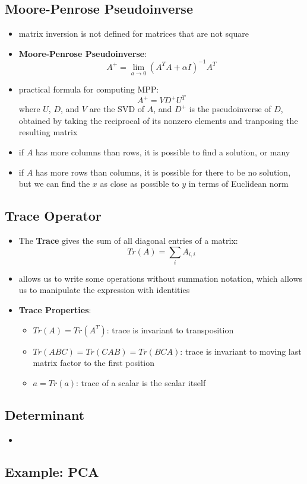 \subsection{Moore-Penrose Pseudoinverse}
\begin{itemize}
    \item matrix inversion is not defined for matrices that are not square
    \item \textbf{Moore-Penrose Pseudoinverse}:
    $$ A^+ = \lim_{a \rightarrow 0}(A^TA + \alpha I)^{-1}A^T$$
    \item practical formula for computing MPP:
    $$ A^+ = V D^+ U^T$$
    where $U$, $D$, and $V$ are the SVD of $A$, and $D^+$ is the pseudoinverse of $D$, obtained by taking the reciprocal of its nonzero elements and tranposing the resulting matrix
    \item if $A$ has more columns than rows, it is possible to find a solution, or many
    \item if $A$ has more rows than columns, it is possible for there to be no solution, but we can find the $x$ as close as possible to $y$ in terms of Euclidean norm
\end{itemize}

\subsection{Trace Operator}
\begin{itemize}
    \item The \textbf{Trace} gives the sum of all diagonal entries of a matrix:
    $$ Tr(A) = \sum_i A_{i,i}$$
    \item allows us to write some operations without summation notation, which allows us to manipulate the expression with identities 
    \item \textbf{Trace Properties}:
    \begin{itemize}
        \item $Tr(A) = Tr(A^T)$: trace is invariant to transposition
        \item $Tr(ABC) = Tr(CAB) = Tr(BCA)$: trace is invariant to moving last matrix factor to the first position
        \item $a = Tr(a)$: trace of a scalar is the scalar itself
    \end{itemize}
\end{itemize}

\subsection{Determinant}
\begin{itemize}
    \item
\end{itemize}

\subsection{Example: PCA}

